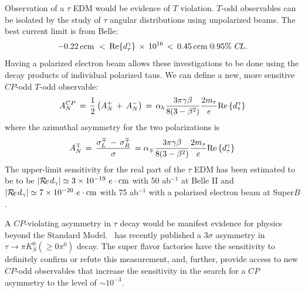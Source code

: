 Observation of a $\tau$ EDM would be evidence of $T$ violation.  $T$-odd observables can be isolated by the study of $\tau$ angular
distributions using unpolarized beams. The best current limit is from Belle:
\vskip -12pt
\[ - 0.22\,e{\rm{cm}}\,\, < \,{\mathop{\rm Re}\nolimits} \{ d_\tau ^\gamma \} \, \times \,{10^{16}}\, < \,0.45\,e{\rm{cm}}\,@\,95\% \,\,C\!L.\]
\vskip -8pt
Having a polarized electron
beam allows these investigations to be done using the decay products
of individual polarized taus. We can define a new, more sensitive $C\!P$-odd $T$-odd observable:
\vskip -12pt
\[A_N^{CP}\, = \,\frac{1}{2}\left( {A_N^ + \, + \,A_N^ - } \right)\, = \,{\alpha _h}\frac{{3\pi \gamma \beta }}{{8(3 - {\beta ^2})}}\frac{{2{m_\tau }}}{e}{\mathop{\rm Re}\nolimits} \left\{ {d_\tau ^\gamma } \right\}\]
where the azimuthal asymmetry for the two polarizations is 
\[A_N^ \mp \, = \,\frac{{\sigma _L^ \mp \, - \,\sigma _R^ \mp }}{\sigma }\, = {\alpha _ \mp }\frac{{3\pi \gamma \beta }}{{8(3 - {\beta ^2})}}\frac{{2{m_\tau }}}{e}{\mathop{\rm Re}\nolimits} \left\{ {d_\tau ^\gamma } \right\}\]
\vskip -12pt
The upper-limit sensitivity for the real part of the
$\tau$ EDM has been estimated to be to be $|\Re{d_\gamma}|\simeq 3\times 10^{-19} \ e \cdot {\rm cm}$
with 50 ab$^{-1 }$ at Belle II and $|\Re{d_\gamma}|\simeq 7\times 10^{-20} \ e \cdot {\rm cm}$
with 75 ab$^{-1 }$ with a polarized electron beam at Super$B$\cite{ref:b2}.

A $C\!P$-violating asymmetry in $\tau$ decay would be manifest evidence
for physics beyond the Standard Model. \babar\ has recently published
a 3$\sigma$ asymmetry in $\tau\to\pi K_S^0(\ge 0\pi^0)$
decay\cite{BABAR:2011aa}. The super flavor factories have the sensitivity to
definitely confirm or refute this measurement, and, further, provide
access to new $C\!P$-odd observables that increase the sensitivity in the
search for a $C\!P$ asymmetry to the level of $\sim 10^{-3}$.
